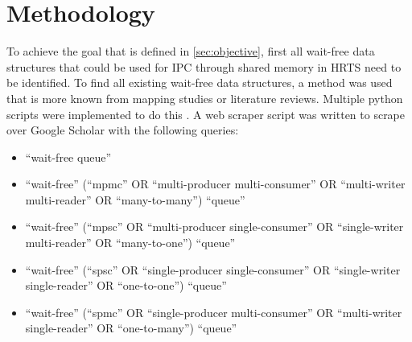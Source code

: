 \chapter{Methodology}\label{ch:methodology}
To achieve the goal that is defined in \cref{sec:objective}, first all wait-free data structures that could be used for \ac{IPC} through shared memory in \ac{HRTS} need to be identified. To find all existing wait-free data structures, a method was used that is more known from mapping studies or literature reviews. Multiple python scripts were implemented to do this \cite{githubMA}. A web scraper script was written to scrape over Google Scholar with the following queries:
\begin{itemize}
   \item \enquote{wait-free queue}
   \item \enquote{wait-free} (\enquote{mpmc} OR \enquote{multi-producer multi-consumer} OR \enquote{multi-writer multi-reader} OR \enquote{many-to-many}) \enquote{queue}
   \item \enquote{wait-free} (\enquote{mpsc} OR \enquote{multi-producer single-consumer} OR \enquote{single-writer multi-reader} OR \enquote{many-to-one}) \enquote{queue}
   \item \enquote{wait-free} (\enquote{spsc} OR \enquote{single-producer single-consumer} OR \enquote{single-writer single-reader} OR \enquote{one-to-one}) \enquote{queue}
   \item \enquote{wait-free} (\enquote{spmc} OR \enquote{single-producer multi-consumer} OR \enquote{multi-writer single-reader} OR \enquote{one-to-many}) \enquote{queue}
\end{itemize}
